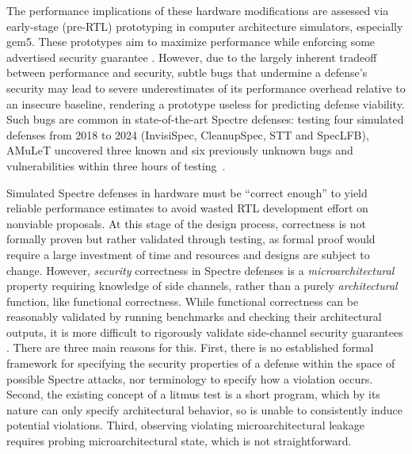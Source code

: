 The performance implications of these hardware modifications are assessed via early-stage (pre-RTL) prototyping in computer architecture simulators, especially gem5\cite{gem5}. These prototypes aim to maximize performance while enforcing some advertised security guarantee . However, due to the largely inherent tradeoff between performance and security, subtle bugs that undermine a defense’s security may lead to severe underestimates of its performance overhead relative to an insecure baseline, rendering a prototype useless for predicting defense viability. 
Such bugs are common in state-of-the-art Spectre defenses: testing four simulated defenses from 2018 to 2024 (InvisiSpec, CleanupSpec, STT and SpecLFB), AMuLeT uncovered three known and six previously unknown bugs and vulnerabilities within three hours of testing~\cite{amulet}\cite{nickscommittoSTT}.


Simulated Spectre defenses in hardware must be “correct enough” to yield reliable performance estimates to avoid wasted RTL development effort on nonviable proposals. At this stage of the design process, correctness is not formally proven but rather validated through testing, as formal proof would require a large investment of time and resources and designs are subject to change. However, \textit{security} correctness in Spectre defenses is a \textit{microarchitectural} property requiring knowledge of side channels, rather than a purely \textit{architectural} function, like functional correctness. While functional correctness can be reasonably validated by running benchmarks and checking their architectural outputs, it is more difficult to rigorously validate side-channel security guarantees \cite{spec2017}. There are three main reasons for this. First, there is no established formal framework for specifying the security properties of a defense within the space of possible Spectre attacks, nor terminology to specify how a violation occurs. Second, the existing concept of a litmus test is a short program, which by its nature can only specify architectural behavior, so is unable to consistently induce potential violations. Third, observing violating microarchitectural leakage requires probing microarchitectural state, which is not straightforward. 


